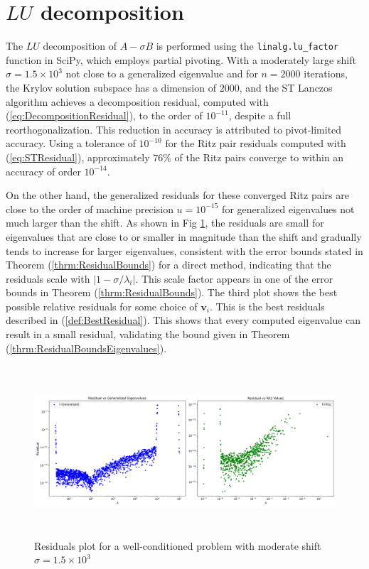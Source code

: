 \section{$LU$ decomposition}
The $LU$ decomposition of $A - \sigma B$ is performed using the \texttt{linalg.lu\_factor} function in SciPy, which employs partial pivoting. With a moderately large shift $\sigma = 1.5 \times 10^3$ not close to a generalized eigenvalue and for $n = 2000$ iterations, the Krylov solution subspace has a dimension of $2000$, and the ST Lanczos algorithm achieves a decomposition residual, computed with (\ref{eq:DecompositionResidual}), to the order of $10^{-11}$, despite a full reorthogonalization. This reduction in accuracy is attributed to pivot-limited accuracy. Using a tolerance of $10^{-10}$ for the Ritz pair residuals computed with (\ref{eq:STResidual}), approximately $76\%$ of the Ritz pairs converge to within an accuracy of order $10^{-14}$.

On the other hand, the generalized residuals for these converged Ritz pairs are close to the order of machine precision $u=10^{-15}$ for generalized eigenvalues not much larger than the shift. As shown in Fig \ref{fig:LUResidualsModShift}, the residuals are small for eigenvalues that are close to or smaller in magnitude than the shift and gradually tends to increase for larger eigenvalues, consistent with the error bounds stated in Theorem (\ref{thrm:ResidualBounds}) for a direct method, indicating that the residuals scale with $\lvert 1-\sigma/\lambda_i \rvert$. This scale factor appears in one of the error bounds in Theorem (\ref{thrm:ResidualBounds}). The third plot shows the best possible relative residuals for some choice of $\mathbf{v}_i$. This is the best residuals described in (\ref{def:BestResidual}). This shows that every computed eigenvalue can result in a small residual, validating the bound given in Theorem (\ref{thrm:ResidualBoundsEigenvalues}).

\begin{figure}
	\centering
	\caption{Residuals plot for a well-conditioned problem with moderate shift $\sigma=1.5 \times 10^3$}
	\includegraphics[height=2.5in]{./Plots/LU/residuals_plot_well_mod.png}
	
	\label{fig:LUResidualsModShift}
\end{figure}

